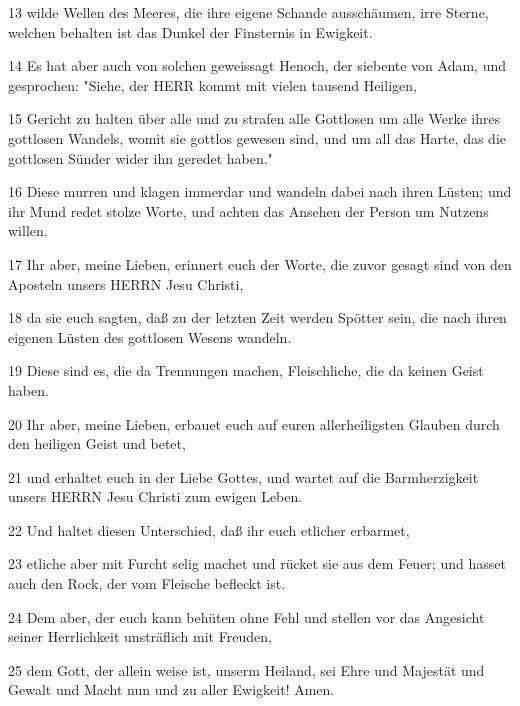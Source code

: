 \par 13 wilde Wellen des Meeres, die ihre eigene Schande ausschäumen, irre Sterne, welchen behalten ist das Dunkel der Finsternis in Ewigkeit.
\par 14 Es hat aber auch von solchen geweissagt Henoch, der siebente von Adam, und gesprochen: "Siehe, der HERR kommt mit vielen tausend Heiligen,
\par 15 Gericht zu halten über alle und zu strafen alle Gottlosen um alle Werke ihres gottlosen Wandels, womit sie gottlos gewesen sind, und um all das Harte, das die gottlosen Sünder wider ihn geredet haben."
\par 16 Diese murren und klagen immerdar und wandeln dabei nach ihren Lüsten; und ihr Mund redet stolze Worte, und achten das Ansehen der Person um Nutzens willen.
\par 17 Ihr aber, meine Lieben, erinnert euch der Worte, die zuvor gesagt sind von den Aposteln unsers HERRN Jesu Christi,
\par 18 da sie euch sagten, daß zu der letzten Zeit werden Spötter sein, die nach ihren eigenen Lüsten des gottlosen Wesens wandeln.
\par 19 Diese sind es, die da Trennungen machen, Fleischliche, die da keinen Geist haben.
\par 20 Ihr aber, meine Lieben, erbauet euch auf euren allerheiligsten Glauben durch den heiligen Geist und betet,
\par 21 und erhaltet euch in der Liebe Gottes, und wartet auf die Barmherzigkeit unsers HERRN Jesu Christi zum ewigen Leben.
\par 22 Und haltet diesen Unterschied, daß ihr euch etlicher erbarmet,
\par 23 etliche aber mit Furcht selig machet und rücket sie aus dem Feuer; und hasset auch den Rock, der vom Fleische befleckt ist.
\par 24 Dem aber, der euch kann behüten ohne Fehl und stellen vor das Angesicht seiner Herrlichkeit unsträflich mit Freuden,
\par 25 dem Gott, der allein weise ist, unserm Heiland, sei Ehre und Majestät und Gewalt und Macht nun und zu aller Ewigkeit! Amen.

